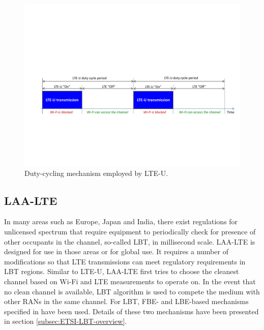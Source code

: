 \documentclass[12pt,onecolumn]{article}
\begin{document}
\begin{figure}[!t]
\centering
\includegraphics[width=0.95\columnwidth]{figures2/LTE-U}
\caption{Duty-cycling mechanism employed by LTE-U.}
\label{figs:LTE-U}
\end{figure}

\subsection{LAA-LTE}
\label{subsection:LAA-LTE}

\noindent In many areas such as Europe, Japan and India, there exist regulations for unlicensed spectrum that require equipment to periodically check for presence of other occupants in the channel, so-called LBT, in millisecond scale. LAA-LTE is designed for use in those areas or for global use. It requires a number of modifications so that LTE transmissions can meet regulatory requirements in LBT regions. Similar to LTE-U, LAA-LTE first tries to choose the cleanest channel based on Wi-Fi and LTE measurements to operate on. In the event that no clean channel is available, LBT algorithm is used to compete the medium with other RANs in the same channel. For LBT, FBE- and LBE-based mechanisms specified in \cite{LBT-ETSI-2014} have been used. Details of these two mechanisms have been presented in section \ref{subsec:ETSI-LBT-overview}.
\end{document}

